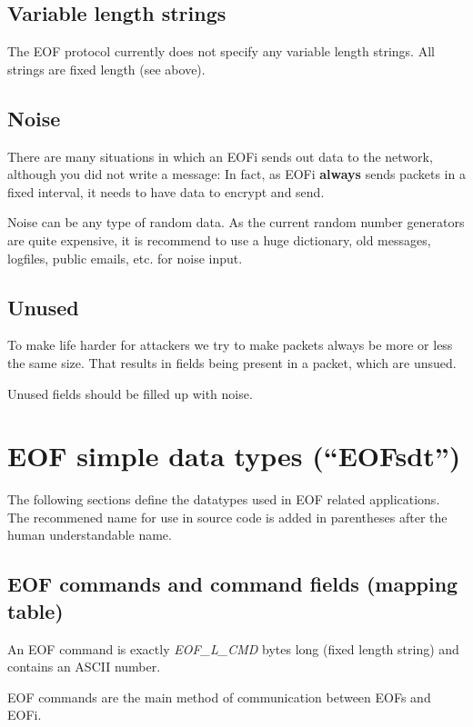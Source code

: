 \documentclass[12pt,a4paper]{book}
\begin{document}
\subsection{Variable length strings}
The EOF protocol currently does not specify any variable length strings.
All strings are fixed length (see above).
\subsection{Noise}
There are many situations in which an EOFi sends out data to the network,
although you did not write a message: In fact, as EOFi \textbf{always}
sends packets in a fixed interval, it needs to have data to encrypt and send.

Noise can be any type of random data. As the current random number generators
are quite expensive, it is recommend to use a huge dictionary, old
messages, logfiles, public emails, etc. for noise input.
\subsection{Unused}
To make life harder for attackers we try to make packets always be more or
less the same size. That results in fields being present in a packet, which
are unsued.

Unused fields should be filled up with noise.
\section{EOF simple data types ("`EOFsdt"')}
The following sections define the datatypes used in EOF related
applications. The recommened name for use in source
code is added in parentheses after the human understandable name.
\subsection{EOF commands and command fields (mapping table)}
An EOF command is exactly \emph{EOF\_L\_CMD} bytes long (fixed length string)
and contains an ASCII number.

EOF commands are the main method of communication between EOFs and EOFi.
\end{document}
